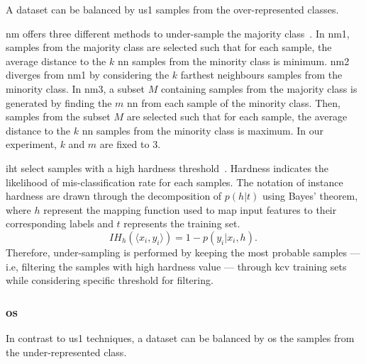\documentclass[final,3p,times,twocolumn]{elsarticle}
\begin{document}
A dataset can be balanced by \ac{us1} samples from the over-represented
classes.

\Ac{nm} offers three different methods to under-sample the majority
class~\cite{mani2003knn}. In \ac{nm1}, samples from the majority class are
selected such that for each sample, the average distance to the $k$ \ac{nn}
samples from the minority class is minimum. \ac{nm2} diverges from \ac{nm1} by
considering the $k$ farthest neighbours samples from the minority class. In
\ac{nm3}, a subset $M$ containing samples from the majority class is generated
by finding the $m$ \ac{nn} from each sample of the minority class. Then,
samples from the subset $M$ are selected such that for each sample, the average
distance to the $k$ \ac{nn} samples from the minority class is maximum. In our
experiment, $k$ and $m$ are fixed to 3.

\Ac{iht} select samples with a high hardness
threshold~\cite{smith2014instance}. Hardness indicates the likelihood of
mis-classification rate for each samples. The notation of instance hardness
are drawn through the decomposition of $p(h \vert t)$ using Bayes' theorem,
where $h$ represent the mapping function used to map input features to their
corresponding labels and $t$ represents the training set.
\begin{equation}
  IH_h(\langle x_{i}, y_{i}\rangle) = 1 - p(y_i \vert x_i, h).\
  \label{eq:iht}
\end{equation}
Therefore, under-sampling is performed by keeping the most probable samples ---
i.e, filtering the samples with high hardness value --- through \ac{kcv}
training sets while considering specific threshold for filtering.

\subsubsection{\Acl*{os}}

In contrast to \ac{us1} techniques, a dataset can be balanced by \ac{os} the
samples from the under-represented class.
\end{document}
